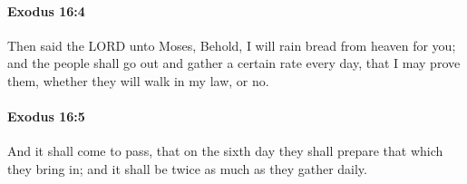 		\paragraph{Exodus 16:4} %
			\label{EXODUS-16-4}

			Then said the LORD unto Moses, Behold, I will rain bread from heaven for you; and the people shall go out and gather a certain rate every day, that I may prove them, whether they will walk in my law, or no.


		\paragraph{Exodus 16:5} %
			\label{EXODUS-16-5}

			And it shall come to pass, that on the sixth day they shall prepare that which they bring in; and it shall be twice as much as they gather daily.


